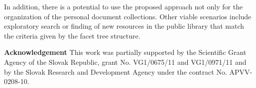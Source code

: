 \documentclass[12pt]{article}
\begin{document}
In addition, there is a potential to use the proposed approach not only for the organization of the personal document collections. Other viable scenarios include exploratory search or finding of new resources in the public library that match the criteria given by the facet tree structure.
 

\textbf{Acknowledgement } This work was partially supported by the Scientific Grant Agency of the Slovak Republic, grant No. VG1/0675/11 and VG1/0971/11 and by the Slovak Research and Development  Agency under the contract No. APVV-0208-10.







 
 
 
 
   
   
  
   
   
   
   
   
   
   
   
\end{document}
